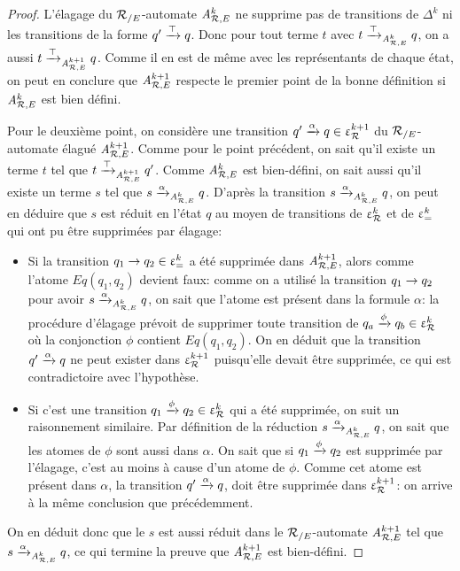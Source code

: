 \begin{proof}
L'élagage du ${\mathcal R_{/E}}$-automate ${\mathit A}_{\mathcal R,E}^k$ ne supprime pas de transitions de $\Delta^k$
ni les transitions de la forme $q'\xrightarrow{\top} q$. Donc pour tout terme $t$ avec
$t \xrightarrow{\top}_{{\mathit A}_{\mathcal R,E}^k} q$, on a aussi $t \xrightarrow{\top}_{{\mathit A}_{\mathcal R,E}^{k+1}} q$. Comme il en est de même
avec les représentants de chaque état, on peut en conclure que ${\mathit A}_{\mathcal R,E}^{k+1}$ respecte le premier
point de la bonne définition si ${\mathit A}_{\mathcal R,E}^k$ est bien défini.

Pour le deuxième point, on considère une transition $q' \xrightarrow{\alpha} q \in \upvarepsilon_{\mathcal R}^{k+1}$ du ${\mathcal R_{/E}}$-automate
élagué ${\mathit A}_{\mathcal R,E}^{k+1}$.
Comme pour le point précédent, on sait qu'il existe un terme $t$ tel que $t \xrightarrow{\top}_{{\mathit A}_{\mathcal R,E}^{k+1}} q'$. 
Comme ${\mathit A}_{\mathcal R,E}^{k}$ est bien-défini, on sait aussi qu'il existe un terme $s$ tel que $s \xrightarrow{\alpha}_{{\mathit A}_{\mathcal R,E}^k} q$.
D'après la transition $s \xrightarrow{\alpha}_{{\mathit A}_{\mathcal R,E}^k} q$, on peut en déduire que $s$ est réduit en l'état $q$
au moyen de transitions de $\upvarepsilon_{\mathcal R}^k$ et de $\upvarepsilon_{=}^k$ qui ont pu être supprimées par élagage:
\begin{itemize}
\item 
  Si la transition $q_1 \rightarrow q_2 \in \upvarepsilon_{=}^k$ a été supprimée dans ${\mathit A}_{\mathcal R,E}^{k+1}$, alors comme l'atome $Eq(q_1,q_2)$
devient faux: comme on a utilisé la transition $q_1 \rightarrow q_2$ pour avoir $s \xrightarrow{\alpha}_{{\mathit A}_{\mathcal R,E}^k} q$,
on sait que l'atome est présent dans la formule $\alpha$: la procédure d'élagage prévoit de supprimer 
toute transition de $q_a \xrightarrow{\phi} q_b \in \upvarepsilon_{\mathcal R}^k$ où la conjonction $\phi$ contient  $Eq(q_1,q_2)$.
On en déduit que la transition $q' \xrightarrow{\alpha} q$ ne peut exister dans $\upvarepsilon_{\mathcal R}^{k+1}$ puisqu'elle devait être supprimée,
ce qui est contradictoire avec l'hypothèse.
\item 
  Si c'est une transition $q_1 \xrightarrow{\phi} q_2 \in \upvarepsilon_{\mathcal R}^k$ qui a été supprimée, on suit un raisonnement similaire.
  Par définition de la réduction $s \xrightarrow{\alpha}_{{\mathit A}_{\mathcal R,E}^k} q$, on sait que les atomes de $\phi$ sont aussi
  dans $\alpha$.  On sait que si $q_1 \xrightarrow{\phi} q_2$ est supprimée par l'élagage, c'est au moins à cause d'un atome
  de $\phi$. Comme cet atome est présent dans $\alpha$, la transition $q' \xrightarrow{\alpha} q$, doit être supprimée dans 
  $\upvarepsilon_{\mathcal R}^{k+1}$: on arrive à la même conclusion que précédemment.
\end{itemize}
On en déduit donc que le $s$ est aussi réduit dans le ${\mathcal R_{/E}}$-automate ${\mathit A}_{\mathcal R,E}^{k+1}$ tel que $s \xrightarrow{\alpha}_{{\mathit A}_{\mathcal R,E}^k} q$,
ce qui termine la preuve que ${\mathit A}_{\mathcal R,E}^{k+1}$ est bien-défini.
\end{proof}

